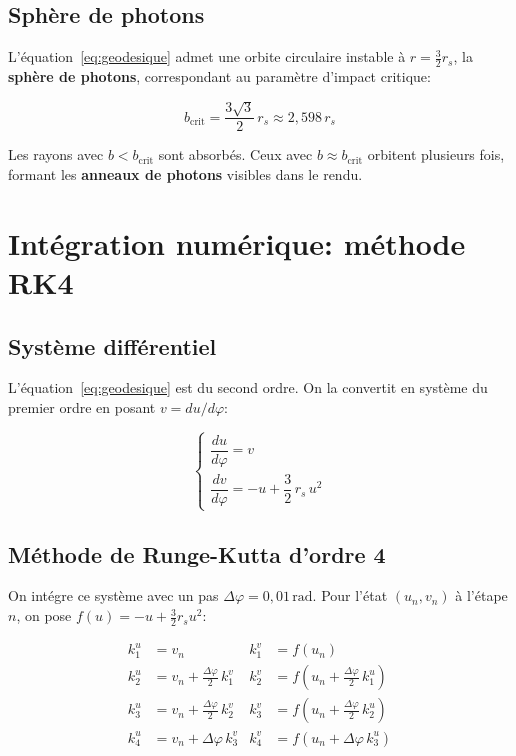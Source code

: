 \documentclass[12pt, a4paper]{article}
\begin{document}
\subsection{Sphère de photons}

L'équation~\eqref{eq:geodesique} admet une orbite circulaire instable à
$r = \frac{3}{2}r_s$, la \textbf{sphère de photons}, correspondant au
paramètre d'impact critique:

\begin{equation}
    b_{\text{crit}} = \frac{3\sqrt{3}}{2}\,r_s \approx 2{,}598\,r_s
\end{equation}

Les rayons avec $b < b_{\text{crit}}$ sont absorbés. Ceux avec
$b \approx b_{\text{crit}}$ orbitent plusieurs fois, formant les
\textbf{anneaux de photons} visibles dans le rendu.

\section{Intégration numérique: méthode RK4}

\subsection{Système différentiel}

L'équation~\eqref{eq:geodesique} est du second ordre. On la convertit en
système du premier ordre en posant $v = du/d\varphi$:

\begin{equation}
    \begin{cases}
        \dfrac{du}{d\varphi} = v \\[8pt]
        \dfrac{dv}{d\varphi} = -u + \dfrac{3}{2}\,r_s\,u^2
    \end{cases}
\end{equation}

\subsection{Méthode de Runge-Kutta d'ordre 4}

On intégre ce système avec un pas $\Delta\varphi = 0{,}01\,\text{rad}$.
Pour l'état $(u_n, v_n)$ à l'étape $n$, on pose $f(u) = -u + \frac{3}{2}r_s u^2$:

\begin{align}
    k_1^u &= v_n
    & k_1^v &= f(u_n) \\
    k_2^u &= v_n + \tfrac{\Delta\varphi}{2}\,k_1^v
    & k_2^v &= f\!\left(u_n + \tfrac{\Delta\varphi}{2}\,k_1^u\right) \\
    k_3^u &= v_n + \tfrac{\Delta\varphi}{2}\,k_2^v
    & k_3^v &= f\!\left(u_n + \tfrac{\Delta\varphi}{2}\,k_2^u\right) \\
    k_4^u &= v_n + \Delta\varphi\,k_3^v
    & k_4^v &= f\!\left(u_n + \Delta\varphi\,k_3^u\right)
\end{align}
\end{document}
